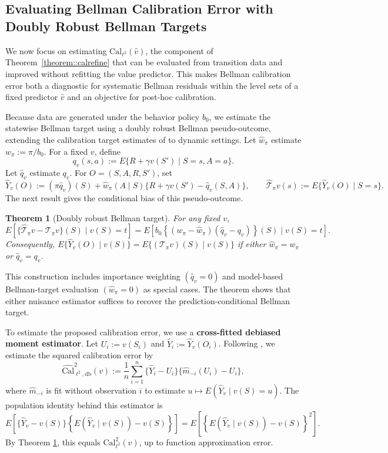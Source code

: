 \documentclass{article}
\theoremstyle{plain}
\newtheorem{theorem}{Theorem}
\theoremstyle{definition}
\theoremstyle{remark}
\begin{document}
\subsection{Evaluating Bellman Calibration Error with Doubly Robust Bellman Targets}
\label{sec:bellman-calibration-error}

We now focus on estimating \(\mathrm{Cal}_{\ell^2}(\hat v)\), the component of
Theorem~\ref{theorem::calrefine} that can be evaluated from transition data
and improved without refitting the value predictor. This makes Bellman calibration error both
a diagnostic for systematic Bellman residuals within the level sets of a fixed
predictor \(\hat v\) and an objective for post-hoc calibration.

Because data are generated under the behavior policy \(b_0\), we estimate the
statewise Bellman target using a doubly robust Bellman pseudo-outcome, extending
the calibration target estimates of \citep{xu2022calibration,van2023causal} to
dynamic settings. Let \(\widehat w_\pi\) estimate \(w_\pi:=\pi/b_0\). For a
fixed \(v\), define
\[
q_v(s,a)
:=
E\{R+\gamma v(S')\mid S=s,A=a\}.
\]
Let \(\hat q_v\) estimate \(q_v\). For \(O=(S,A,R,S')\), set
\[
\widehat Y_v(O)
:=
(\pi \hat q_v)(S)
+
\widehat w_\pi(A\mid S)
\{R+\gamma v(S')-\hat q_v(S,A)\},
\qquad
\widehat{\mathcal T}_\pi v(s)
:=
E\{\widehat Y_v(O)\mid S=s\}.
\]
The next result gives the conditional bias of this pseudo-outcome.

\begin{theorem}[Doubly robust Bellman target]
\label{theorem::DRpseudo}
For any fixed \(v\),
\[
E\!\left[
\{\widehat{\mathcal T}_\pi v-\mathcal T_\pi v\}(S)
\mid v(S)=t
\right]
=
E\!\left[
  b_0\!\left\{(w_\pi-\widehat w_\pi)(\hat q_v-q_v)\right\}(S)
  \mid v(S)=t
\right].
\]
Consequently, \(E\{\widehat Y_v(O)\mid v(S)\}
=
E\{(\mathcal T_\pi v)(S)\mid v(S)\}\) if either
\(\widehat w_\pi=w_\pi\) or \(\hat q_v=q_v\).
\end{theorem}

This construction includes importance weighting \((\hat q_v=0)\) and
model-based Bellman-target evaluation \((\widehat w_\pi=0)\) as special cases.
The theorem shows that either nuisance estimator suffices to recover the
prediction-conditional Bellman target.

To estimate the proposed calibration error, we use a \textbf{cross-fitted debiased moment estimator}.
Let \(U_i:=v(S_i)\) and \(\widehat Y_i:=\widehat Y_v(O_i)\). Following
\citet{xu2022calibration}, we estimate the squared calibration error by 
\[
\widehat{\mathrm{Cal}}_{\ell^2,\mathrm{db}}^2(v)
:=
\frac1n\sum_{i=1}^n
\{\widehat Y_i-U_i\}
\{\widehat m_{-i}(U_i)-U_i\},
\]
where \(\widehat m_{-i}\) is fit without observation \(i\) to estimate
\(u\mapsto E(\widehat Y_v\mid v(S)=u)\). The population identity behind this
estimator is
\[
E\!\left[
\{\widehat Y_v-v(S)\}
\left\{E(\widehat Y_v\mid v(S))-v(S)\right\}
\right]
=
E\!\left[
\left\{E(\widehat Y_v\mid v(S))-v(S)\right\}^2
\right].
\]
By Theorem \ref{theorem::DRpseudo}, this equals
\(\mathrm{Cal}_{\ell^2}^2(v)\), up to function approximation error.
\end{document}
